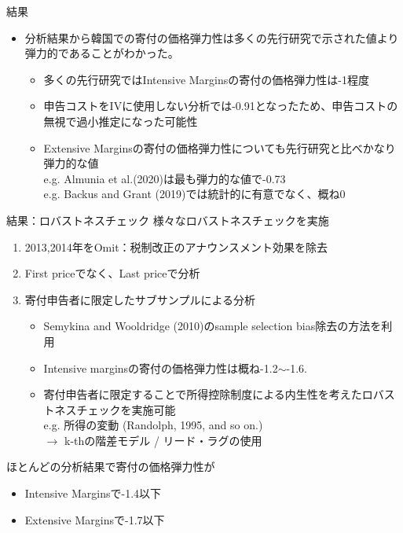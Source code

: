 \documentclass[dvipdfmx,10pt]{beamer}
\begin{document}
\begin{frame}{結果}
	\begin{itemize}
		\item 分析結果から韓国での寄付の価格弾力性は多くの先行研究で示された値より弾力的であることがわかった。
		\begin{itemize}
			\item 多くの先行研究ではIntensive Marginsの寄付の価格弾力性は-1程度
			\item 申告コストをIVに使用しない分析では-0.91となったため、申告コストの無視で過小推定になった可能性
		  	\item Extensive Marginsの寄付の価格弾力性についても先行研究と比べかなり弾力的な値\\
		  	e.g. Almunia et al.(2020)は最も弾力的な値で-0.73\\
		  	e.g. Backus and Grant (2019)では統計的に有意でなく、概ね0
		  \end{itemize}
	\end{itemize}
\end{frame}

\begin{frame}{結果：ロバストネスチェック}
 様々なロバストネスチェックを実施
		\begin{enumerate}
			\item 2013,2014年をOmit：税制改正のアナウンスメント効果を除去
			\item First priceでなく、Last priceで分析
			\item 寄付申告者に限定したサブサンプルによる分析
			\begin{itemize}
				\item Semykina and Wooldridge (2010)のsample selection bias除去の方法を利用
				\item Intensive marginsの寄付の価格弾力性は概ね-1.2\(\sim\)-1.6.
				\item 寄付申告者に限定することで所得控除制度による内生性を考えたロバストネスチェックを実施可能\\
				e.g. 所得の変動 (Randolph, 1995, and so on.)\\
				$\to$ k-thの階差モデル / リード・ラグの使用  
			\end{itemize}
		\end{enumerate}
		ほとんどの分析結果で寄付の価格弾力性が
		\begin{itemize}
			\item Intensive Marginsで-1.4以下 
			\item Extensive Marginsで-1.7以下
		\end{itemize}
\end{frame}
\end{document}
